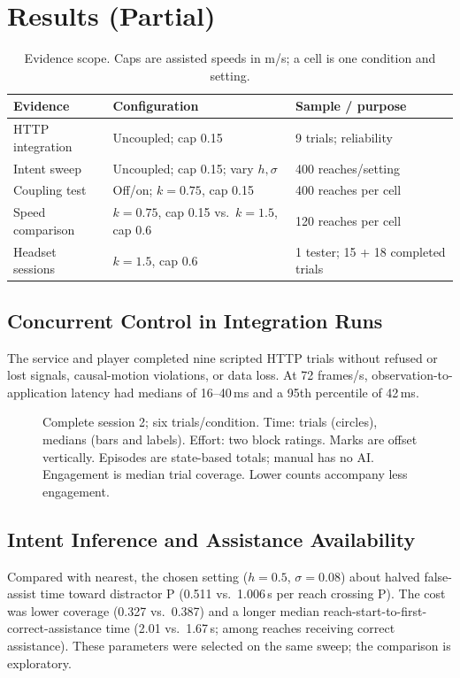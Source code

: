 \section{Results (Partial)}

\begin{table}[!t]
\caption{Evidence scope. Caps are assisted speeds in m/s; a cell is one condition and setting.}
\label{tab:evidence}
\centering\scriptsize\setlength{\tabcolsep}{3pt}
\begin{tabular}{@{}p{}p{}p{}@{}}
\toprule
Evidence & Configuration & Sample / purpose \\
\midrule
HTTP integration & Uncoupled; cap 0.15 & 9 trials; reliability \\
Intent sweep & Uncoupled; cap 0.15; vary $h,\sigma$ & 400 reaches/setting \\
Coupling test & Off/on; $k=0.75$, cap 0.15 & 400 reaches per cell \\
Speed comparison & $k=0.75$, cap 0.15 vs.\ $k=1.5$, cap 0.6 & 120 reaches per cell \\
Headset sessions & $k=1.5$, cap 0.6 & 1 tester; 15 + 18 completed trials \\
\bottomrule
\end{tabular}
\end{table}

\subsection{Concurrent Control in Integration Runs}
The service and player completed nine scripted HTTP trials without refused or
lost signals, causal-motion violations, or data loss. At 72 frames/s,
observation-to-application latency had medians of 16--40\,ms and a 95th
percentile of 42\,ms.

\begin{figure}[!t]
\centering

\caption{Complete session 2; six trials/condition. Time: trials (circles),
medians (bars and labels). Effort: two block ratings. Marks are offset vertically.
Episodes are state-based totals; manual has no AI. Engagement is median trial
coverage. Lower counts accompany less engagement.}
\label{fig:headset}
\end{figure}

\subsection{Intent Inference and Assistance Availability}
Compared with nearest, the chosen setting ($h = 0.5$, $\sigma = 0.08$) about
halved false-assist time toward distractor P (0.511 vs.\ 1.006\,s per reach crossing P).
The cost was lower coverage (0.327 vs.\ 0.387) and a
longer median reach-start-to-first-correct-assistance time (2.01 vs.\ 1.67\,s;
among reaches receiving correct assistance). These parameters were selected
on the same sweep; the comparison is exploratory.

